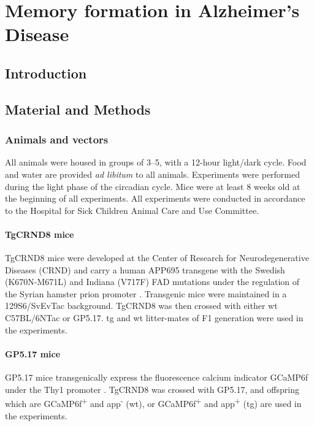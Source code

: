 \chapter{Memory formation in Alzheimer's Disease}
\section{Introduction}

\section{Material and Methods}

\subsection{Animals and vectors}
All animals were housed in groups of 3--5, with a 12-hour light/dark cycle. Food and water are provided \textit{ad libitum} to all animals. Experiments were performed during the light phase of the circadian cycle. Mice were at least 8 weeks old at the beginning of all experiments. All experiments were conducted in accordance to the Hospital for Sick Children Animal Care and Use Committee.

\subsubsection{TgCRND8 mice}
TgCRND8 mice were developed at the Center of Research for Neurodegenerative Diseases (CRND) and carry a human APP695 transgene with the Swedish (K670N-M671L) and Indiana (V717F) FAD mutations under the regulation of the Syrian hamster prion promoter \citep{chishti01}. Transgenic mice were maintained in a 129S6/SvEvTac background. TgCRND8 was then crossed with either \gls{wt} C57BL/6NTac or GP5.17. \Gls{tg} and \gls{wt} litter-mates of F1 generation were used in the experiments.


\subsubsection{GP5.17 mice}
GP5.17 mice transgenically express the fluorescence calcium indicator GCaMP6f under the Thy1 promoter \citep{dana14}. TgCRND8 was crossed with GP5.17, and offspring which are GCaMP6f\textsuperscript{+} and \gls{app}\textsuperscript{-} (\gls{wt}), or GCaMP6f\textsuperscript{+} and \gls{app}\textsuperscript{+} (\gls{tg}) are used in the experiments. 

